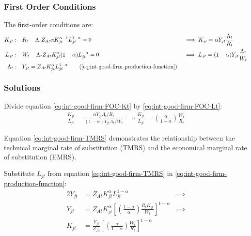 \documentclass[
thesis.tex
]{subfiles}
\begin{document}
	\subsubsection*{First Order Conditions}
	
	The first-order conditions are:
	\begin{alignat}{2}
		K_{jt}: \quad & R_t - \Lambda_t Z_{At} \alpha K_{jt}^{\alpha-1} L_{jt}^{1-\alpha} = 0 &&\implies K_{jt} = \alpha Y_{jt} \frac{\Lambda_t}{R_t} \label{eq:int-good-firm-FOC-Kt} \\
		L_{jt}: \quad & W_t - \Lambda_t Z_{At} K_{jt}^\alpha (1-\alpha) L_{jt}^{-\alpha} = 0 \quad &&\implies L_{jt} = (1-\alpha) Y_{jt} \frac{\Lambda_t}{W_t} \label{eq:int-good-firm-FOC-Lt} \\
		\Lambda_t: \quad & Y_{jt} = Z_{At} K_{jt}^\alpha L_{jt}^{1-\alpha} \tag{\ref{eq:int-good-firm-production-function}}
	\end{alignat}
	
	\subsubsection*{Solutions}
	
	Divide equation \ref{eq:int-good-firm-FOC-Kt} by \ref{eq:int-good-firm-FOC-Lt}:
	\begin{align}
		\frac{K_{jt}}{L_{jt}} = \frac{\alpha Y_{jt} \Lambda_t /R_t}{(1-\alpha) Y_{jt} \Lambda_t /W_t} \implies
		\frac{K_{jt}}{L_{jt}} = \left( \frac{\alpha}{1-\alpha} \right) \frac{W_t}{R_t} \label{eq:int-good-firm-TMRS}
	\end{align}
	
	Equation \ref{eq:int-good-firm-TMRS} demonstrates the relationship between the technical marginal rate of substitution (TMRS) and the economical marginal rate of substitution (EMRS). 
	
	Substitute $L_{jt}$ from equation \ref{eq:int-good-firm-TMRS} in \ref{eq:int-good-firm-production-function}:
	\begin{alignat}{2}
		Y_{jt} & = Z_{At} K_{jt}^\alpha L_{jt}^{1-\alpha} &\implies \nonumber \\
		Y_{jt} & = Z_{At} K_{jt}^\alpha \left[ \left( \frac{1-\alpha}{\alpha} \right) \frac{R_t K_{jt}}{W_t} \right]^{1-\alpha} &\implies \nonumber \\
		K_{jt} & = \frac{Y_{jt}}{Z_{At}} \left[ \left( \frac{\alpha}{1-\alpha} \right) \frac{W_t}{R_t}\right]^{1-\alpha} \label{eq:int-good-firm-Kt-demand}
	\end{alignat}
	
\end{document}
